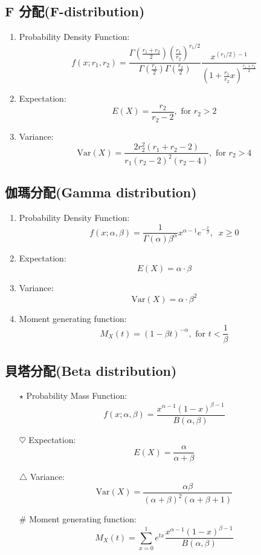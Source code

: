 \subsection{F 分配(F-distribution)}
\begin{enumerate}[$\rightarrow$]
\item Probability Density Function:$$f(x;r_1,r_2)=\frac{\Gamma\left(\frac{r_1+r_2}{2}\right) \left(\frac{r_1}{r_2}\right)^{r_1/2}}{\Gamma\left(\frac{r_1}{2}\right)\Gamma\left(\frac{r_2}{2}\right)} \frac{x^{(r_1/2)-1}}{\left(1+\frac{r_1}{r_2}x\right)^{\frac{r_1+r_2}{2}}}$$
\item Expectation:$$E(X)=\frac{r_2}{r_2 - 2},\text{ for } r_2 > 2$$
\item Variance:$$\text{Var}(X) = \frac{2r_2^2 (r_1+r_2-2)}{r_1(r_2-2)^2(r_2-4)}, \text{ for } r_2 > 4$$
\end{enumerate}
\subsection{伽瑪分配(Gamma distribution)}
\begin{enumerate}[*]
\item Probability Density Function:$$f(x;\alpha,\beta)=\frac{1}{\Gamma(\alpha)\beta^\alpha}x^{\alpha-1}e^{-\frac{x}{\beta}}, \;\; x\geq 0$$
\item Expectation:$$E(X)=\alpha\cdot\beta$$
\item Variance:$$\text{Var}(X)=\alpha\cdot\beta^2$$
\item Moment generating function:$$M_X(t)=(1-\beta t)^{-\alpha}, \text{ for } t < \frac{1}{\beta}$$
\end{enumerate}
\subsection{貝塔分配(Beta distribution)}
\begin{enumerate}
\item[$\star$] Probability Mass Function:$$f(x; \alpha, \beta) = \frac{x^{\alpha-1}(1-x)^{\beta-1}}{B(\alpha, \beta)}$$
\item[$\heartsuit$] Expectation:$$E(X) = \frac{\alpha}{\alpha + \beta}$$
\item[$\triangle$] Variance:$$\text{Var}(X) = \frac{\alpha\beta}{(\alpha + \beta)^2(\alpha + \beta + 1)}$$
\item[$\#$] Moment generating function:$$M_X(t) = \sum_{x=0}^{1} e^{tx} \frac{x^{\alpha-1}(1-x)^{\beta-1}}{B(\alpha, \beta)}$$
\end{enumerate}
